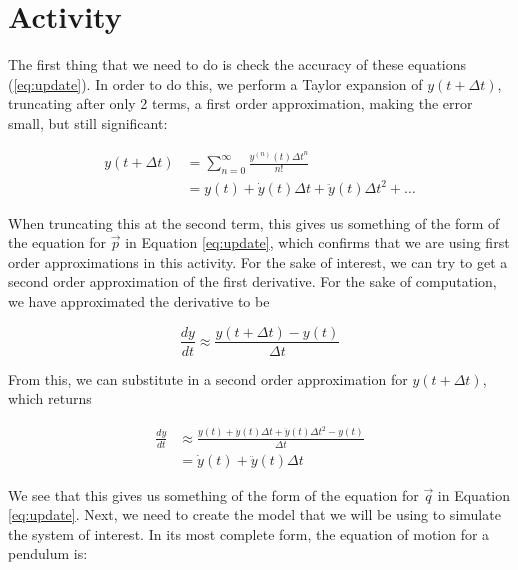 \documentclass[12pt]{article}
\begin{document}
    \section{Activity}
    The first thing that we need to do is check the accuracy of these equations (\ref{eq:update}). 
    In order to do this, we perform a Taylor expansion of $y(t+\Delta t)$, truncating after 
    only 2 terms, a first order approximation, making the error small, but still significant:
    
    \begin{equation*}
        \begin{split}
            y(t+\Delta t) &= \sum_{n=0}^\infty \frac{y^{(n)}(t)\Delta t^n}{n!} \\
            &= y(t) + \dot{y}(t) \Delta t + \ddot{y}(t) \Delta t^2 + \dots
        \end{split}
    \end{equation*}

    \noindent
    When truncating this at the second term, this gives us something of the form of the 
    equation for $\vec{p}$ in Equation \ref{eq:update}, which confirms that we are using 
    first order approximations in this activity. 
    \newline
    For the sake of interest, we can try to get a second order approximation of the first 
    derivative. For the sake of computation, we have approximated the derivative to be 

    \begin{equation}
        \frac{dy}{dt} \approx \frac{y(t+\Delta t) - y(t)}{\Delta t}
    \end{equation}

    \noindent
    From this, we can substitute in a second order approximation for $y(t+\Delta t)$, 
    which returns

    \begin{equation}
        \begin{split}
            \frac{dy}{dt} &\approx \frac{y(t) + \dot{y}(t) \Delta t + \ddot{y}(t) \Delta t^2 - y(t)}{\Delta t} \\
            &= \dot{y}(t) + \ddot{y}(t) \Delta t
        \end{split}
    \end{equation}

    \noindent
    We see that this gives us something of the form of the equation for $\vec{q}$ in 
    Equation \ref{eq:update}.
    \newline
    Next, we need to create the model that we will be using to simulate the system of 
    interest. In its most complete form, the equation of motion for a pendulum is:
\end{document}
